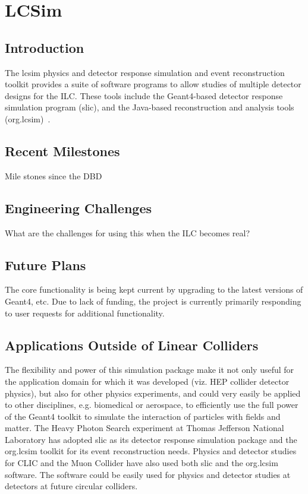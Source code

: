 \section{LCSim}

\subsection{Introduction}
The lcsim physics and detector response simulation and event reconstruction
toolkit provides a suite of
software programs to allow studies of multiple detector
designs for the ILC. These tools
include the Geant4-based detector response simulation program (slic), and the Java-based reconstruction and analysis tools (org.lcsim)~\cite{lcsimWebpage}.

\subsection{Recent Milestones}
{\color{red} Mile stones since the DBD}

\subsection{Engineering Challenges}
{\color{red} What are the challenges for using this when the ILC becomes real?}

\subsection{Future Plans}
The core functionality is being kept current by upgrading to the latest versions
of Geant4, etc. Due to lack of funding, the project is currently primarily
responding to user requests for additional functionality.

\subsection{Applications Outside of Linear Colliders}
The flexibility and power of this simulation package make it not only useful for
the application domain for which it was developed (viz. HEP collider detector
physics), but also for other physics experiments, and could very easily be
applied to other disciplines, e.g. biomedical or aerospace, to efficiently use
the full power of the Geant4 toolkit to simulate the interaction of particles
with fields and matter. The Heavy Photon Search experiment at Thomas
Jefferson National Laboratory has adopted slic as its detector response
simulation package and the org.lcsim toolkit for its event reconstruction needs.
Physics and detector studies for CLIC and the Muon Collider have also
used both slic and the org.lcsim software. The software could be easily used for
physics and detector studies at detectors at future circular colliders.
